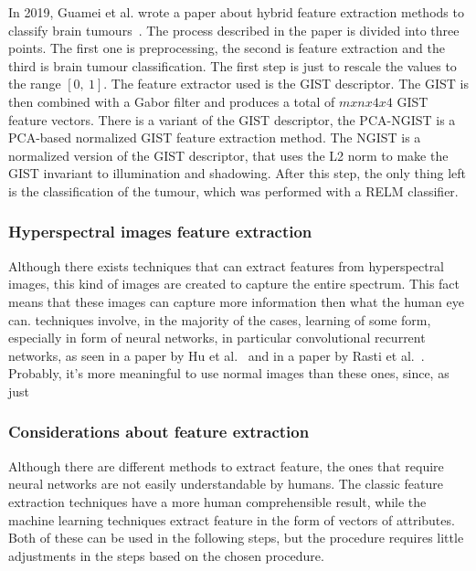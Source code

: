 \documentclass[conference]{IEEEtran}
\begin{document}
				\noindent In 2019, Guamei et al. wrote a paper about hybrid feature extraction methods to classify brain tumours~\cite{gumaei2019hybrid}. The process described in the paper is divided into three points. The 
				first one is preprocessing, the second is feature extraction and the third is brain tumour classification. The first step is just to rescale the values to the range $[0,\ 1]$. The feature extractor 
				used is the GIST descriptor. The GIST is then combined with a Gabor filter and produces a total of $mxnx4x4$ GIST feature vectors. There is a variant of the GIST descriptor, the 
				PCA-NGIST is a PCA-based normalized GIST feature extraction method. The NGIST is a normalized version of the GIST descriptor, that uses the L2 norm to make the GIST invariant to illumination and shadowing. 
				After this step, the only thing left is the classification of the tumour, which was performed with a RELM classifier. 
				
			\subsubsection{Hyperspectral images feature extraction}
				
				Although there exists techniques that can extract features from hyperspectral images, this kind of images are created to capture the entire spectrum. This fact means that these images can capture 
				more information then what the human eye can. techniques involve, in the majority of the cases, learning of some form, especially in form of neural networks, in particular convolutional recurrent 
				networks, as seen in a paper by Hu et al.~\cite{hu2020spatial} and in a paper by Rasti et al.~\cite{rasti2020feature}. Probably, it's more meaningful to use normal images than these ones, since, as just 

			\subsubsection{Considerations about feature extraction}
			
				Although there are different methods to extract feature, the ones that require neural networks are not easily understandable by humans. The classic feature extraction techniques have a more 
				human comprehensible result, while the machine learning techniques extract feature in the form of vectors of attributes. Both of these can be used in the following steps, but the procedure requires 
				little adjustments in the steps based on the chosen procedure.
		
\end{document}
